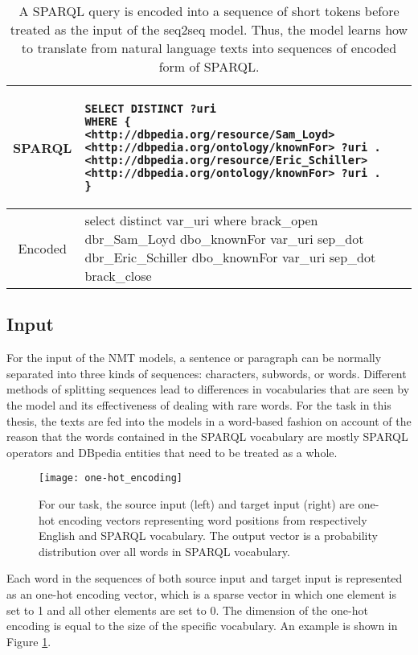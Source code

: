 \begin{table}[h]
\begin{tabular}{c | p{}}
SPARQL & \begin{lstlisting}[language=SPARQL]
SELECT DISTINCT ?uri 
WHERE { 
<http://dbpedia.org/resource/Sam_Loyd> <http://dbpedia.org/ontology/knownFor> ?uri .
<http://dbpedia.org/resource/Eric_Schiller> <http://dbpedia.org/ontology/knownFor> ?uri . 
}
\end{lstlisting} \\
\hline
Encoded & {\small select distinct var\_uri where brack\_open dbr\_Sam\_Loyd dbo\_knownFor var\_uri sep\_dot dbr\_Eric\_Schiller dbo\_knownFor var\_uri sep\_dot brack\_close}
\end{tabular}
\caption{A SPARQL query is encoded into a sequence of short tokens before treated as the input of the seq2seq model. Thus, the model learns how to translate from natural language texts into sequences of encoded form of SPARQL.}
\label{table:sparql encoding}
\end{table}



\subsection{Input} \label{subsection:preliminary input}

For the input of the NMT models, a sentence or paragraph can be normally separated into three kinds of sequences: characters, subwords, or words. Different methods of splitting sequences lead to differences in vocabularies that are seen by the model and its effectiveness of dealing with rare words. For the task in this thesis, the texts are fed into the models in a word-based fashion on account of the reason that the words contained in the SPARQL vocabulary are mostly SPARQL operators and DBpedia entities that need to be treated as a whole.

\begin{figure}[h]
\texttt{[image: one-hot\_encoding]}
\centering
\caption{For our task, the source input (left) and target input (right) are one-hot encoding vectors representing word positions from respectively English and SPARQL vocabulary. The output vector is a probability distribution over all words in SPARQL vocabulary.}
\label{figure:one-hot encoding}
\end{figure}

Each word in the sequences of both source input and target input is represented as an one-hot encoding vector, which is a sparse vector in which one element is set to 1 and all other elements are set to 0. The dimension of the one-hot encoding is equal to the size of the specific vocabulary. An example is shown in Figure \ref{figure:one-hot encoding}.


